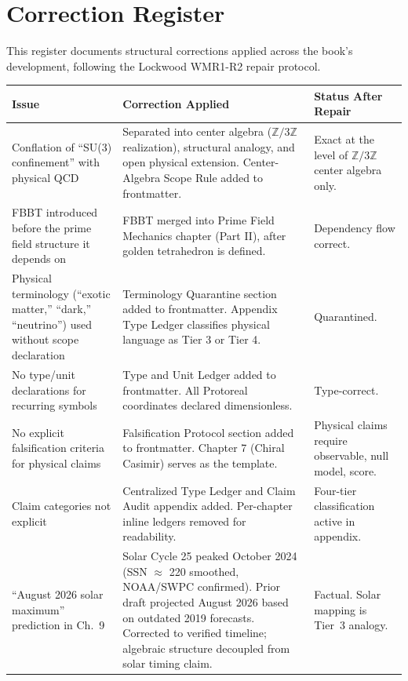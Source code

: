 \documentclass[12pt,oneside]{book}
\theoremstyle{principia}
\theoremstyle{definition}
\theoremstyle{remark}
\providecommand{\ZZ}{\mathbb{Z}}
\begin{document}
\section{Correction Register}

This register documents structural corrections applied across the book's development, following the Lockwood WMR1-R2 repair protocol.

\begin{center}
\begin{tabular}{@{}p{4cm}p{5cm}p{4cm}@{}}
\toprule
\textbf{Issue} & \textbf{Correction Applied} & \textbf{Status After Repair} \\
\midrule
Conflation of ``SU(3) confinement'' with physical QCD & Separated into center algebra ($\ZZ/3\ZZ$ realization), structural analogy, and open physical extension. Center-Algebra Scope Rule added to frontmatter. & Exact at the level of $\ZZ/3\ZZ$ center algebra only. \\
\midrule
FBBT introduced before the prime field structure it depends on & FBBT merged into Prime Field Mechanics chapter (Part II), after golden tetrahedron is defined. & Dependency flow correct. \\
\midrule
Physical terminology (``exotic matter,'' ``dark,'' ``neutrino'') used without scope declaration & Terminology Quarantine section added to frontmatter. Appendix Type Ledger classifies physical language as Tier 3 or Tier 4. & Quarantined. \\
\midrule
No type/unit declarations for recurring symbols & Type and Unit Ledger added to frontmatter. All Protoreal coordinates declared dimensionless. & Type-correct. \\
\midrule
No explicit falsification criteria for physical claims & Falsification Protocol section added to frontmatter. Chapter 7 (Chiral Casimir) serves as the template. & Physical claims require observable, null model, score. \\
\midrule
Claim categories not explicit & Centralized Type Ledger and Claim Audit appendix added. Per-chapter inline ledgers removed for readability. & Four-tier classification active in appendix. \\
\midrule
``August 2026 solar maximum'' prediction in Ch.~9 & Solar Cycle 25 peaked October 2024 (SSN $\approx$ 220 smoothed, NOAA/SWPC confirmed). Prior draft projected August 2026 based on outdated 2019 forecasts. Corrected to verified timeline; algebraic structure decoupled from solar timing claim. & Factual. Solar mapping is Tier~3 analogy. \\

\end{tabular}
\end{center}
\end{document}
